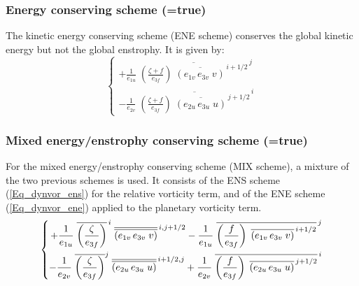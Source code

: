 \documentclass[NEMO_book]{subfiles}
\begin{document}
\subsubsection{Energy conserving scheme (=true)}
\label{DYN_vor_ene}

The kinetic energy conserving scheme (ENE scheme) conserves the global 
kinetic energy but not the global enstrophy. It is given by:
\begin{equation} \label{Eq_dynvor_ene}
\left\{   \begin{aligned}
{+\frac{1}{e_{1u}}\; {\overline {\left( {\frac{\zeta +f}{e_{3f} }} \right)
                            \;  \overline {\left( {e_{1v}\,e_{3v}\;v} \right)} ^{\,i+1/2}} }^{\,j} }    \\
{- \frac{1}{e_{2v}}\; {\overline {\left( {\frac{\zeta +f}{e_{3f} }} \right)
                            \;  \overline {\left( {e_{2u}\,e_{3u}\;u} \right)} ^{\,j+1/2}} }^{\,i} }
\end{aligned}    \right.
\end{equation} 

\subsubsection{Mixed energy/enstrophy conserving scheme (=true) }
\label{DYN_vor_mix}

For the mixed energy/enstrophy conserving scheme (MIX scheme), a mixture of the 
two previous schemes is used. It consists of the ENS scheme (\ref{Eq_dynvor_ens}) 
for the relative vorticity term, and of the ENE scheme (\ref{Eq_dynvor_ene}) applied 
to the planetary vorticity term.
\begin{equation} \label{Eq_dynvor_mix}
\left\{ {     \begin{aligned}
 {+\frac{1}{e_{1u} }\; {\overline {\left( {\frac{\zeta }{e_{3f} }} \right)} }^{\,i} 
 \; {\overline{\overline {\left( {e_{1v}\,e_{3v}\;v} \right)}} }^{\,i,j+1/2} -\frac{1}{e_{1u} }
 \; {\overline {\left( {\frac{f}{e_{3f} }} \right) 
 \;\overline {\left( {e_{1v}\,e_{3v}\;v} \right)} ^{\,i+1/2}} }^{\,j} } \\
{-\frac{1}{e_{2v} }\; {\overline {\left( {\frac{\zeta }{e_{3f} }} \right)} }^j
 \; {\overline{\overline {\left( {e_{2u}\,e_{3u}\;u} \right)}} }^{\,i+1/2,j} +\frac{1}{e_{2v} }
 \; {\overline {\left( {\frac{f}{e_{3f} }} \right)
 \;\overline {\left( {e_{2u}\,e_{3u}\;u} \right)} ^{\,j+1/2}} }^{\,i} } \hfill
\end{aligned}     } \right.
\end{equation} 
\end{document}
